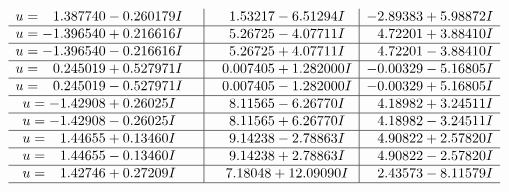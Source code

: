\documentclass[1p]{elsarticle_modified}
\theoremstyle{definition}
\begin{document}
$$\begin{array}{c|c|c}
\begin{aligned}
u &= \phantom{-}1.387740 - 0.260179 I\end{aligned}
 & \phantom{-}1.53217 - 6.51294 I & -2.89383 + 5.98872 I \\ \hline\begin{aligned}
u &= -1.396540 + 0.216616 I\end{aligned}
 & \phantom{-}5.26725 - 4.07711 I & \phantom{-}4.72201 + 3.88410 I \\ \hline\begin{aligned}
u &= -1.396540 - 0.216616 I\end{aligned}
 & \phantom{-}5.26725 + 4.07711 I & \phantom{-}4.72201 - 3.88410 I \\ \hline\begin{aligned}
u &= \phantom{-}0.245019 + 0.527971 I\end{aligned}
 & \phantom{-}0.007405 + 1.282000 I & -0.00329 - 5.16805 I \\ \hline\begin{aligned}
u &= \phantom{-}0.245019 - 0.527971 I\end{aligned}
 & \phantom{-}0.007405 - 1.282000 I & -0.00329 + 5.16805 I \\ \hline\begin{aligned}
u &= -1.42908 + 0.26025 I\end{aligned}
 & \phantom{-}8.11565 - 6.26770 I & \phantom{-}4.18982 + 3.24511 I \\ \hline\begin{aligned}
u &= -1.42908 - 0.26025 I\end{aligned}
 & \phantom{-}8.11565 + 6.26770 I & \phantom{-}4.18982 - 3.24511 I \\ \hline\begin{aligned}
u &= \phantom{-}1.44655 + 0.13460 I\end{aligned}
 & \phantom{-}9.14238 - 2.78863 I & \phantom{-}4.90822 + 2.57820 I \\ \hline\begin{aligned}
u &= \phantom{-}1.44655 - 0.13460 I\end{aligned}
 & \phantom{-}9.14238 + 2.78863 I & \phantom{-}4.90822 - 2.57820 I \\ \hline\begin{aligned}
u &= \phantom{-}1.42746 + 0.27209 I\end{aligned}
 & \phantom{-}7.18048 + 12.09090 I & \phantom{-}2.43573 - 8.11579 I\\
 \hline 
 \end{array}$$\newpage$$\begin{array}{c|c|c}  

\end{array}$$
\end{document}
